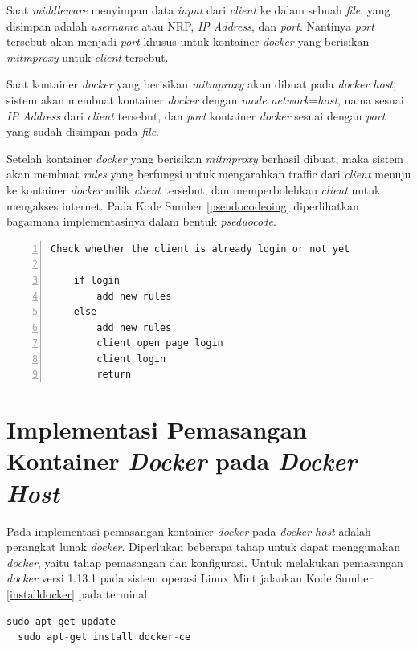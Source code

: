   Saat \textit{middleware} menyimpan data \textit{input} dari \textit{client} ke dalam sebuah \textit{file}, yang disimpan adalah \textit{username} atau NRP, \textit{IP Address}, dan \textit{port}. Nantinya \textit{port} tersebut akan menjadi \textit{port} khusus untuk kontainer \textit{docker} yang berisikan \textit{mitmproxy} untuk \textit{client} tersebut.
  
  Saat kontainer \textit{docker} yang berisikan \textit{mitmproxy} akan dibuat pada \textit{docker host}, sistem akan membuat kontainer \textit{docker} dengan \textit{mode network}=\textit{host}, nama sesuai \textit{IP Address} dari \textit{client} tersebut, dan \textit{port} kontainer \textit{docker} sesuai dengan \textit{port} yang sudah disimpan pada \textit{file}.
  
  Setelah kontainer \textit{docker} yang berisikan \textit{mitmproxy} berhasil dibuat, maka sistem akan membuat \textit{rules} yang berfungsi untuk mengarahkan traffic dari \textit{client} menuju ke kontainer \textit{docker} milik \textit{client} tersebut, dan memperbolehkan \textit{client} untuk mengakses internet. Pada Kode Sumber \ref{pseudocodeoing} diperlihatkan bagaimana implementasinya dalam bentuk \textit{pseduocode}.
  \newline
  \begin{minipage}{\linewidth}  
  	\begin{lstlisting}[numbers=left, frame=single,tabsize=2,breaklines,caption={Pseudocode Web Service},label=pseudocodeoing]
  	Check whether the client is already login or not yet
  	
  	if login
	  	add new rules
  	else
	  	add new rules
	  	client open page login
	  	client login
	  	return  	
  	\end{lstlisting}
  \end{minipage}
  
  \section{Implementasi Pemasangan Kontainer \textit{Docker} pada \textit{Docker Host}}
  Pada implementasi pemasangan kontainer \textit{docker} pada \textit{docker host} adalah perangkat lunak \textit{docker}. Diperlukan beberapa tahap untuk dapat menggunakan \textit{docker}, yaitu tahap pemasangan dan konfigurasi. Untuk melakukan pemasangan \textit{docker} versi 1.13.1 pada sistem operasi Linux Mint jalankan Kode Sumber \ref{installdocker} pada terminal.
  \newline
  \begin{minipage}{\linewidth}
  \begin{lstlisting}[caption=Perintah untuk installasi Docker,language=Python,label=installdocker]
  sudo apt-get update
  sudo apt-get install docker-ce
  \end{lstlisting}
  \end{minipage}
  
